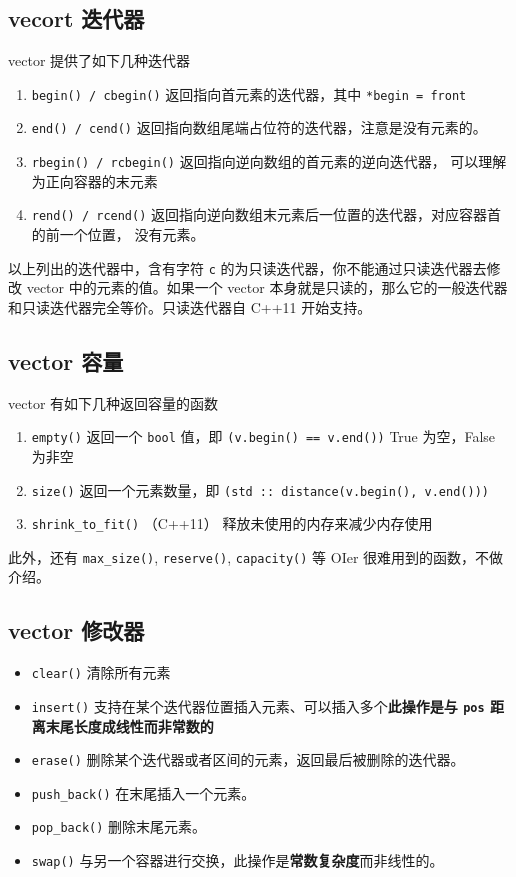 \subsection{vecort 迭代器}

vector 提供了如下几种迭代器

\begin{enumerate}
\item \texttt{begin() / cbegin()}
返回指向首元素的迭代器，其中 \texttt{*begin = front}
\item \texttt{end() / cend()}
返回指向数组尾端占位符的迭代器，注意是没有元素的。
\item \texttt{rbegin() / rcbegin()}
返回指向逆向数组的首元素的逆向迭代器， 可以理解为正向容器的末元素
\item \texttt{rend() / rcend()}
返回指向逆向数组末元素后一位置的迭代器，对应容器首的前一个位置， 没有元素。
\end{enumerate}

以上列出的迭代器中，含有字符 \texttt{c} 的为只读迭代器，你不能通过只读迭代器去修改 vector 中的元素的值。如果一个 vector 本身就是只读的，那么它的一般迭代器和只读迭代器完全等价。只读迭代器自 C++11 开始支持。

\subsection{vector 容量}

vector 有如下几种返回容量的函数

\begin{enumerate}
\item \texttt{empty()}
返回一个 \texttt{bool} 值，即 \texttt{(v.begin() == v.end())} True 为空，False 为非空
\item \texttt{size()}
返回一个元素数量，即 \texttt{(std :: distance(v.begin(), v.end()))}
\item \texttt{shrink_to_fit()} （C++11）
释放未使用的内存来减少内存使用
\end{enumerate}

此外，还有 \texttt{max_size()}, \texttt{reserve()}, \texttt{capacity()} 等 OIer 很难用到的函数，不做介绍。

\subsection{vector 修改器}

\begin{itemize}
\item \texttt{clear()} 清除所有元素
\item \texttt{insert()} 支持在某个迭代器位置插入元素、可以插入多个\textbf{此操作是与 \texttt{pos} 距离末尾长度成线性而非常数的}
\item \texttt{erase()} 删除某个迭代器或者区间的元素，返回最后被删除的迭代器。
\item \texttt{push_back()} 在末尾插入一个元素。
\item \texttt{pop_back()} 删除末尾元素。
\item \texttt{swap()} 与另一个容器进行交换，此操作是\textbf{常数复杂度}而非线性的。
\end{itemize}

